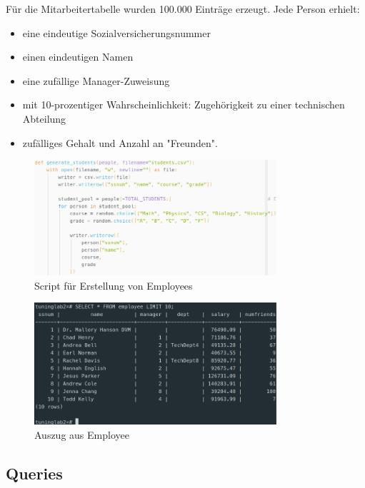 \documentclass[11pt]{scrartcl}
\begin{document}
Für die Mitarbeitertabelle wurden 100.000 Einträge erzeugt. Jede Person erhielt:

\begin{itemize}
    \item eine eindeutige Sozialversicherungsnummer
    \item einen eindeutigen Namen
    \item eine zufällige Manager-Zuweisung
    \item mit 10-prozentiger Wahrscheinlichkeit: Zugehörigkeit zu einer technischen Abteilung
    \item zufälliges Gehalt und Anzahl an "Freunden".
\end{itemize}

\begin{figure}[htbp]
    \centering
    \includegraphics[width=0.8\textwidth]{Pics/ScriptEmployee.jpg}
    \caption{Script für Erstellung von Employees}
    \label{fig:ScriptEmployee}
\end{figure}

\begin{figure}[htbp]
    \centering
    \includegraphics[width=0.8\textwidth]{Pics/EmployeeResult.jpg}
    \caption{Auszug aus Employee}
    \label{fig:EmployeeResult}
\end{figure}

\subsection*{Queries}
\end{document}
